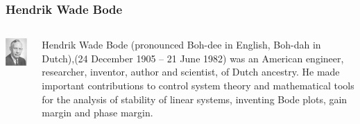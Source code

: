\documentclass{beamer}
\begin{document}
\begin{frame}
\frametitle{Hendrik Wade Bode}
\label{sec-2-10}
\begin{columns}
\begin{column}{0.3\textwidth}
\label{sec-2-10-1}

    \includegraphics[width=.9\linewidth]{image/Bode.png}
\end{column}
\begin{column}{0.7\textwidth}
\label{sec-2-10-2}


   Hendrik Wade Bode (pronounced Boh-dee in English, Boh-dah in Dutch),(24 December 1905 – 21 June 1982) was an American engineer, researcher, inventor, author and scientist, of Dutch ancestry.
   He made important contributions to control system theory and mathematical tools for the analysis of stability of linear systems, inventing Bode plots, gain margin and phase margin.
\end{column}
\end{columns}
\end{frame}
\end{document}
